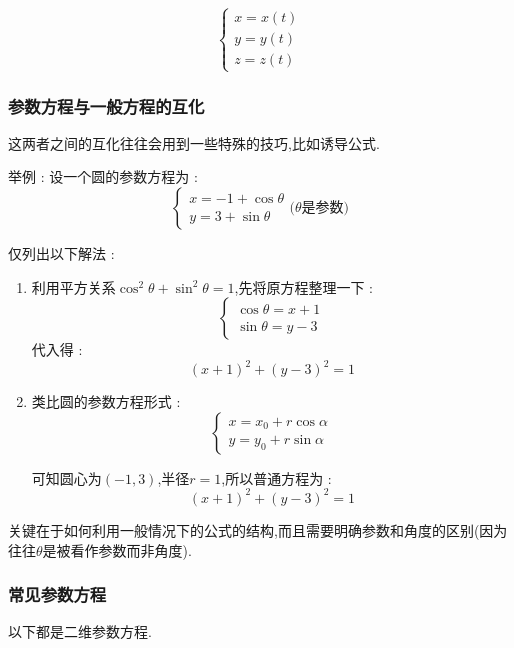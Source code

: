 \documentclass[UTF8,12pt]{ctexbook}
\begin{document}
{{{{\begin{enumerate}
{              $$
                \begin{cases}
                  x = x(t) \\
                  y = y(t) \\
                  z = z(t)
                \end{cases}
              $$
              }
      \end{enumerate}
    }%

    \subsubsection{参数方程与一般方程的互化}{
      这两者之间的互化往往会用到一些特殊的技巧,比如诱导公式.

      举例 : 设一个圆的参数方程为 : $$
        \begin{cases}
          x = -1 + \cos \theta \\
          y = 3 + \sin \theta
        \end{cases}
        \mbox{($\theta$是参数)}
      $$

      仅列出以下解法 :
      \begin{enumerate}
        \item {
              利用平方关系$\cos^2\theta + \sin^2\theta = 1$,先将原方程整理一下 : $$
                \begin{cases}
                  \cos\theta = x + 1 \\
                  \sin\theta = y - 3
                \end{cases}
              $$
              代入得 : $$
                (x + 1)^2 + (y - 3)^2 = 1
              $$
              }
        \item {
              类比圆的参数方程形式 : $$
                \begin{cases}
                  x = x_0 + r\cos\alpha \\
                  y = y_0 + r\sin\alpha
                \end{cases}
              $$

              可知圆心为$(-1,3)$,半径$r = 1$,所以普通方程为 : $$
                (x + 1)^2 + (y - 3)^2 = 1
              $$
              }
      \end{enumerate}

      关键在于如何利用一般情况下的公式的结构,而且需要明确参数和角度的区别(因为往往$\theta$是被看作参数而非角度).
    }%

    \subsubsection{常见参数方程}{
      以下都是二维参数方程.

}}}}
\end{document}
